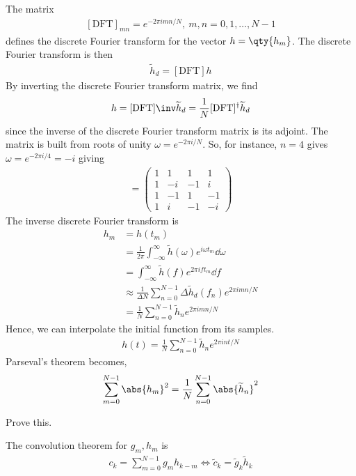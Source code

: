 The matrix 
\begin{align} \label{eq:8.48}
	[\mathrm{DFT}]_{mn} = e^{-2\pi i m n / N},\ m, n = 0, 1, \dots, N-1
\end{align} defines the discrete Fourier transform for the vector $h = \qty{h_m}$.
The discrete Fourier transform is then
\begin{align*}
	\widetilde h_d = [\mathrm{DFT}] h
\end{align*}
By inverting the discrete Fourier transform matrix, we find
\begin{align*}
	h = [\mathrm{DFT}]\inv \widetilde h_d = \frac{1}{N} [\mathrm{DFT}]^\dagger \widetilde h_d
\end{align*}
since the inverse of the discrete Fourier transform matrix is its adjoint.
The matrix is built from roots of unity $\omega = e^{-2\pi i/N}$.
So, for instance, $n = 4$ gives $\omega = e^{-2\pi i/4} = -i$ giving
\begin{align*}
	[\mathrm{DFT}] = \begin{pmatrix}
		1 & 1  & 1  & 1  \\
		1 & -i & -1 & i  \\
		1 & -1 & 1  & -1 \\
		1 & i  & -1 & -i
	\end{pmatrix}
\end{align*}
The inverse discrete Fourier transform is
\begin{align*}
	h_m &= h(t_m) \\
	    &= \frac{1}{2\pi} \int_{-\infty}^\infty \widetilde h(\omega) e^{i \omega t_m} \dd{\omega} \\
	    &= \int_{-\infty}^\infty \widetilde h(f) e^{2\pi i f t_m} \dd{f} \\
	    &\approx \frac{1}{\Delta N} \sum_{n=0}^{N-1} \Delta \widetilde h_d(f_n) e^{2\pi i m n / N} \\
	    &= \frac{1}{N} \sum_{n=0}^{N-1} \widetilde h_n e^{2\pi i m n / N}
\end{align*}
Hence, we can interpolate the initial function from its samples.
\begin{align*}
	h(t) = \frac{1}{N} \sum_{n=0}^{N-1} \widetilde h_n e^{2\pi i n t / N}
\end{align*}
Parseval's theorem becomes,
\begin{align} \label{eq:8.49}
	\sum_{m=0}^{N-1} \abs{h_m}^2 = \frac{1}{N} \sum_{n=0}^{N-1} \abs{\widetilde h_n}^2
\end{align}
\begin{exercise}
	Prove this.
\end{exercise} 
The convolution theorem for $g_m, h_m$ is
\begin{align} \label{eq:8.50}
	c_k = \sum_{m=0}^{N-1} g_m h_{k-m} \iff \widetilde c_k = \widetilde g_k \widetilde h_k
\end{align}


